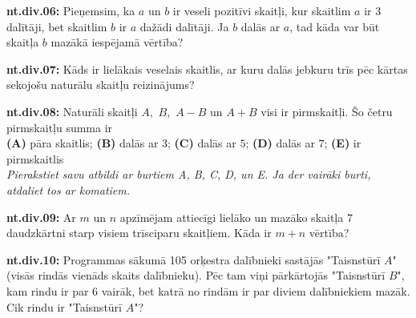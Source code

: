 \documentclass[11pt]{article}
\newenvironment{uzdevums}[1][\unskip]{%
\vspace{3mm}
\noindent
\textbf{#1:}
\noindent}
{}
\begin{document}
\begin{uzdevums}[nt.div.06]
Pieņemsim, ka $a$ un $b$ ir veseli pozitīvi skaitļi, kur skaitlim $a$ ir 3 dalītāji, bet skaitlim $b$ ir $a$ dažādi dalītāji. 
Ja $b$ dalās ar $a$, tad kāda var būt skaitļa $b$ mazākā iespējamā vērtība? 
\end{uzdevums}


\begin{uzdevums}[nt.div.07]
Kāds ir lielākais veselais skaitlis, ar kuru dalās jebkuru trīs pēc kārtas sekojošu naturālu skaitļu reizinājums? 
\end{uzdevums}


\begin{uzdevums}[nt.div.08]
Naturāli skaitļi $A,$ $B,$ $A-B$ un $A+B$ visi ir pirmskaitļi. Šo četru pirmskaitļu summa ir\\
{\bf (A)} pāra skaitlis;\hspace{1ex} {\bf (B)} dalās ar $3$;\hspace{1ex} {\bf (C)} dalās ar $5$;\hspace{1ex} 
{\bf (D)} dalās ar $7$;\hspace{1ex} {\bf (E)} ir pirmskaitlis\\
{\em Pierakstiet savu atbildi ar burtiem A, B, C, D, un E. Ja der vairāki burti, atdaliet tos ar komatiem.}
\end{uzdevums}

\begin{uzdevums}[nt.div.09]
Ar $m$ un $n$ apzīmējam attiecīgi lielāko un mazāko skaitļa 7 daudzkārtni starp visiem trīsciparu skaitļiem. 
Kāda ir $m + n$ vērtība?
\end{uzdevums}


\begin{uzdevums}[nt.div.10]
Programmas sākumā 105 orķestra dalībnieki sastājās "Taisnstūrī $A$" (visās rindās vienāds skaits dalībnieku). 
Pēc tam viņi pārkārtojās "Taisnstūrī $B$", kam rindu ir par 6 vairāk, 
bet katrā no rindām ir par diviem dalībniekiem mazāk. 
Cik rindu ir "Taisnstūrī $A$"? 
\end{uzdevums}
\end{document}
